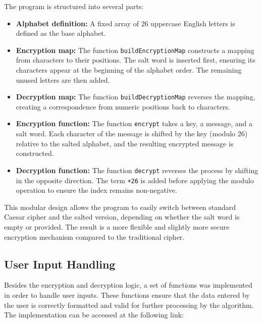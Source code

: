 \documentclass[12pt]{article}
\begin{document}
The program is structured into several parts:

\begin{itemize}
    \item \textbf{Alphabet definition:} A fixed array of 26 uppercase English letters is defined 
    as the base alphabet.

    \item \textbf{Encryption map:} The function \texttt{buildEncryptionMap} constructs a mapping 
    from characters to their positions. The salt word is inserted first, ensuring its characters 
    appear at the beginning of the alphabet order. The remaining unused letters are then added.

    \item \textbf{Decryption map:} The function \texttt{buildDecryptionMap} reverses the mapping, 
    creating a correspondence from numeric positions back to characters.

    \item \textbf{Encryption function:} The function \texttt{encrypt} takes a key, a message, and 
    a salt word. Each character of the message is shifted by the key (modulo 26) relative to the 
    salted alphabet, and the resulting encrypted message is constructed.

    \item \textbf{Decryption function:} The function \texttt{decrypt} reverses the process by 
    shifting in the opposite direction. The term \texttt{+26} is added before applying the 
    modulo operation to ensure the index remains non-negative.
\end{itemize}

This modular design allows the program to easily switch between standard Caesar cipher and the 
salted version, depending on whether the salt word is empty or provided. The result is a more 
flexible and slightly more secure encryption mechanism compared to the traditional cipher.

\subsection{User Input Handling}

Besides the encryption and decryption logic, a set of functions was implemented in order to handle 
user inputs. These functions ensure that the data entered by the user is correctly formatted and 
valid for further processing by the algorithm. The implementation can be accessed at the following link:
\end{document}
